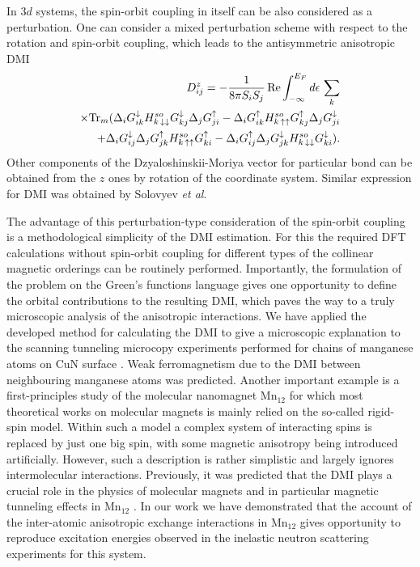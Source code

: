 \documentclass[aps,prl,twocolumn,showpacs,amsmath,amssymb]{revtex4-1}
\begin{document}
In $3d$ systems, the spin-orbit coupling in itself can be also considered as a perturbation. \cite{Bruno,Solovyev}
One can consider a mixed perturbation scheme with respect to the rotation and spin-orbit coupling, which leads to the antisymmetric anisotropic DMI \cite{MnCuN}
\begin{eqnarray}
\label{Dz}
D^{z}_{ij} = - \frac{1}{8 \pi S_i S_j} \, {\rm Re}
\int_{-\infty}^{E_{F}} d \epsilon \, \sum_{k}
\nonumber \\
\times {\rm Tr}_{m} (\Delta_{i} G_{ik}^{\downarrow} H^{so}_{k \, \downarrow \downarrow} G_{kj}^{\downarrow} \Delta
_{j} G_{ji}^{\uparrow} -
\Delta_{i} G_{ik}^{\uparrow} H^{so}_{k \, \uparrow \uparrow} G_{kj}^{\uparrow} \Delta_{j} G_{ji}^{\downarrow}
\nonumber \\
+ \Delta_{i} G_{ij}^{\downarrow} \Delta_{j} G_{jk}^{\uparrow} H^{so}_{k \, \uparrow \uparrow} G_{ki}^{\uparrow} -
\Delta_{i} G_{ij}^{\uparrow} \Delta_{j} G_{jk}^{\downarrow} H^{so}_{k \, \downarrow \downarrow} G_{ki}^{\downarrow}).
\end{eqnarray}
Other components of the Dzyaloshinskii-Moriya vector for particular bond can be obtained from the $z$ ones by rotation of the coordinate system.
Similar expression for DMI was obtained by Solovyev \textit{et al}\cite{Solovyev-LaMnO3}.

The advantage of this perturbation-type consideration of the spin-orbit coupling is a methodological simplicity  of the DMI estimation. For this the required DFT calculations without spin-orbit coupling for different types of the collinear magnetic orderings can be routinely performed. Importantly, the formulation of the problem on the Green's functions language gives one opportunity to define the orbital contributions to the resulting DMI, which paves the way to a truly microscopic analysis of the anisotropic interactions. We have applied the developed method for calculating the DMI to give a microscopic explanation to the scanning tunneling microcopy experiments performed for chains of manganese atoms on CuN surface \cite{MnCuN}. Weak ferromagnetism due to the DMI between neighbouring manganese atoms was predicted. Another important  example is a first-principles study of the molecular nanomagnet Mn$_{12}$ for which most theoretical works on molecular magnets is mainly relied on the so-called rigid-spin model. Within such a model a complex system of interacting spins is replaced by just one big spin, with some magnetic anisotropy being introduced artificially. However, such a description is rather simplistic and largely ignores intermolecular interactions. Previously, it was predicted that the DMI plays a crucial role in the physics of molecular magnets  \cite{Harmon} and in particular magnetic tunneling effects in Mn$_{12}$ \cite{tunneling}.  In our work \cite{Mn12} we have demonstrated that the account of the inter-atomic anisotropic exchange interactions in Mn$_{12}$ gives opportunity to reproduce excitation energies observed in the inelastic neutron scattering experiments for this system.
\end{document}
